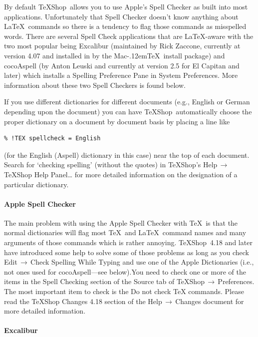 \documentclass[letterpaper,11pt]{article}
\newcommand{\MacTeX}{Mac\kern-.12em\TeX}
\newcommand{\TS}{\textsf{\TeX Shop}}
\newcommand{\cmd}[1]{\textsf{#1}}
\newcommand{\mnu}[1]{\textsf{#1}}
\newcommand{\To}{\,\(\to\)\,}
\begin{document}
By default \TS\ allows you to use Apple's Spell Checker as built into most applications. Unfortunately that Spell Checker doesn't know anything about \LaTeX\ commands so there is a tendency to flag those commands as misspelled words. There are several Spell Check applications that are \LaTeX-aware with the two most popular being \cmd{Excalibur} (maintained by Rick Zaccone, currently at version 4.07 and installed in  by the \MacTeX\ install package) and \cmd{cocoAspell} (by Anton Leuski and currently at version 2.5 for \cmd{El Capitan} and later) which installs a \cmd{Spelling} Preference Pane in \cmd{System Preferences}. More information about these two Spell Checkers is found below.

If you use different dictionaries for different documents (e.g., English or German depending upon the document) you can have \TS\ automatically choose the proper dictionary on a document by document basis by placing a line like
\begin{verbatim}
% !TEX spellcheck = English
\end{verbatim}
(for the \cmd{English (Aspell)} dictionary in this case) near the top of each document. Search for `\cmd{checking spelling}' (without the quotes) in \TS's \mnu{Help}\To\mnu{TeXShop Help Panel…} for more detailed information on the designation of a particular dictionary.

\paragraph{\cmd{Apple Spell Checker}}

The main problem with using the \cmd{Apple Spell Checker} with \TeX\ is that the normal dictionaries will flag most \TeX\ and \LaTeX\ command names and many arguments of those commands which is rather annoying. \TS\ 4.18 and later have introduced some help to solve some of those problems as long as you check \mnu{Edit}\To\mnu{Check Spelling While Typing} and use one of the Apple Dictionaries (i.e., not ones used for \cmd{cocoAspell}---see below).You need to check one or more of the items in the \cmd{Spell Checking} section of the \cmd{Source} tab of \TS\To\mnu{Preferences}. The most important item to check is the \cmd{Do not check TeX commands}. Please read the \cmd{TeXShop Changes 4.18} section of the \mnu{Help}\To\mnu{Changes} document for more detailed information.

\paragraph{\cmd{Excalibur}}
\end{document}
